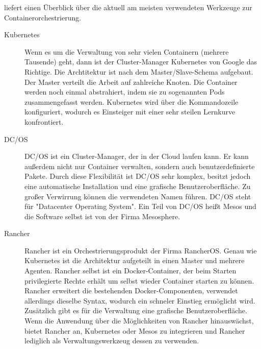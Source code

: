 \autocite{ix-orchestrierung-2017} liefert einen Überblick über die aktuell am meisten verwendeten Werkzeuge zur Containerorchestrierung.
\begin{description}
    \item [Kubernetes] Wenn es um die Verwaltung von sehr vielen Containern (mehrere Tausende) geht, dann ist der Cluster-Manager Kubernetes von Google das Richtige. Die Archtitektur ist nach dem Master/Slave-Schema aufgebaut. Der Master verteilt die Arbeit auf zahlreiche Knoten. Die Container werden noch einmal abstrahiert, indem sie zu sogenannten Pods zusammengefasst werden. Kubernetes wird über die Kommandozeile konfiguriert, wodurch es Einsteiger mit einer sehr steilen Lernkurve konfrontiert.
    \item [DC/OS] DC/OS ist ein Cluster-Manager, der in der Cloud laufen kann. Er kann außerdem nicht nur Container verwalten, sondern auch benutzerdefinierte Pakete. Durch diese Flexibilität ist DC/OS sehr komplex, besitzt jedoch eine automatische Installation und eine grafische Benutzeroberfläche. Zu großer Verwirrung können die verwendeten Namen führen. DC/OS steht für "Datacenter Operating System". Ein Teil von DC/OS heißt Mesos und die Software selbst ist von der Firma Mesosphere.
    \item [Rancher] Rancher ist ein Orchestrierungsprodukt der Firma RancherOS. Genau wie Kubernetes ist die Architektur aufgeteilt in einen Master und mehrere Agenten. Rancher selbst ist ein Docker-Container, der beim Starten privilegierte Rechte erhält um selbst wieder Container starten zu können. Rancher erweitert die bestehenden Docker-Componenten, verwendet allerdings dieselbe Syntax, wodurch ein schneler Einstieg ermöglicht wird.
    Zusätzlich gibt es für die Verwaltung eine grafische Benutzeroberfläche. Wenn die Anwendung über die Möglichkeiten von Rancher hinauswächst, bietet Rancher an, Kubernetes oder Mesos zu integrieren und Rancher lediglich als Verwaltungswerkzeug dessen zu verwenden.
\end{description}
